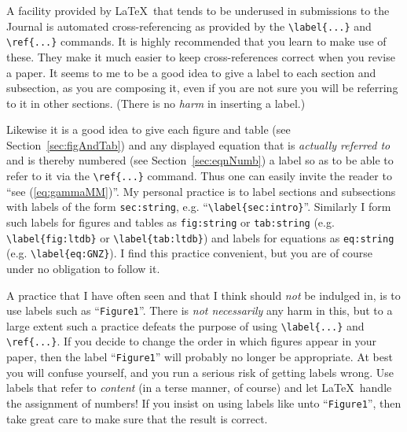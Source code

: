 \documentclass[times, doublespace]{anzsauth}
\begin{document}
A facility provided by \LaTeX\ that tends to be underused in submissions
to the Journal is automated cross-referencing as provided by the
\verb!\label{...}! and \verb!\ref{...}! commands.  It is highly recommended
that you learn to make use of these.  They make it much easier to keep
cross-references correct when you revise a paper.  It seems to me to be
a good idea to give a label to each section and subsection, as you are
composing it, even if you are not sure you will be referring to it
in other sections.  (There is no \emph{harm} in inserting a label.)

Likewise it is a good idea to give each figure and table (see
Section~\ref{sec:figAndTab}) and any displayed equation that
is \emph{actually referred to} and is thereby numbered (see
Section~\ref{sec:eqnNumb}) a label so as to be able to refer to it via
the \verb!\ref{...}!  command.  Thus one can easily invite the reader
to ``see (\ref{eq:gammaMM})''.  My personal practice is to label
sections and subsections with labels of the form \texttt{sec:string},
e.g. ``\verb!\label{sec:intro}!''.  Similarly I form such labels
for figures and tables as \texttt{fig:string} or \texttt{tab:string}
(e.g.  \verb!\label{fig:ltdb}! or \verb!\label{tab:ltdb}!) and labels
for equations as \texttt{eq:string} (e.g. \verb!\label{eq:GNZ}!).
I find this practice convenient, but you are of course under no
obligation to follow it.

A practice that I have often seen and that I think should \emph{not}
be indulged in, is to use labels such as ``\texttt{Figure1}''.  There
is \emph{not necessarily} any harm in this, but to a large extent
such a practice defeats the purpose of using \verb!\label{...}! and
\verb!\ref{...}!.  If you decide to change the order in which
figures appear in your paper, then the label ``\texttt{Figure1}''
will probably no longer be appropriate.  At best you will confuse
yourself, and you run a serious risk of getting labels wrong.
Use labels that refer to \emph{content} (in a terse manner, of
course) and let \LaTeX\ handle the assignment of numbers!  If you
insist on using labels like unto ``\texttt{Figure1}'',
then take great care to make sure that the result is correct.
\end{document}

